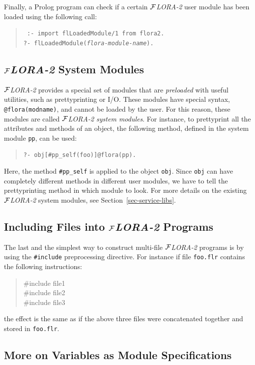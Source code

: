 \documentclass[11pt]{article}
\newcommand{\FLORA}{{\mbox{${\cal F}${\small\it LORA}\rm\emph{-2}}}\xspace}
\begin{document}
Finally, a Prolog program can check if a certain \FLORA user module has been
loaded using the following call:
\begin{quote}
 \tt
 :- import flLoadedModule/1 from flora2.\\
 ?- flLoadedModule({\it flora-module-name}).
\end{quote}

\subsection{\FLORA System Modules}\label{sec-flora-system-modules}

\FLORA provides a special set of modules that are \emph{preloaded} with
useful utilities, such as prettyprinting or I/O. These modules have special
syntax, {\tt @flora(modname)}, and cannot be loaded by the user. For this
reason, these modules are called \emph{\FLORA system modules}.  For
instance, to prettyprint all the attributes and methods of an object, the
following method, defined in the system module {\tt pp}, can be used:
\begin{quote}
 \tt   ?- obj[\#pp\_self(foo)]@flora(pp).
\end{quote}
Here, the method {\tt \#pp\_self} is applied to the object {\tt obj}.
Since {\tt obj} can have completely different methods in different user
modules, we have to tell the prettyprinting method in which module to look.
For more details on the existing \FLORA system modules, see
Section~\ref{sec-service-libs}.


\subsection{Including Files into \FLORA Programs}

The last and the simplest way to construct multi-file \FLORA 
programs is by using the {\tt \#include} preprocessing directive.
For instance if file {\tt foo.flr} contains the following instructions:
\begin{quote}
  \#include file1 \\
  \#include file2\\
  \#include file3
\end{quote}
the effect is the same as if the above three files were concatenated
together and stored in {\tt foo.flr}.

\subsection{More on Variables as Module Specifications}
\end{document}
